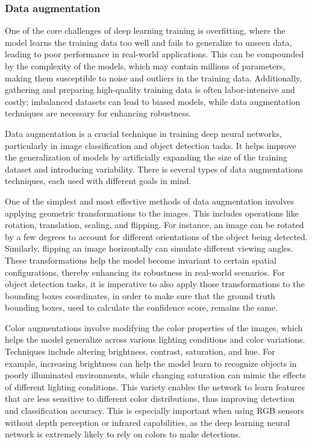 \documentclass[12pt]{article}
\begin{document}
\subsubsection{Data augmentation}

One of the core challenges of deep learning training is overfitting, where the model learns the training data too well and fails to generalize to unseen data, leading to poor performance in real-world applications. This can be compounded by the complexity of the models, which may contain millions of parameters, making them susceptible to noise and outliers in the training data.
Additionally, gathering and preparing high-quality training data is often labor-intensive and costly; imbalanced datasets can lead to biased models, while data augmentation techniques are necessary for enhancing robustness. 

Data augmentation is a crucial technique in training deep neural networks, particularly in image classification and object detection tasks. It helps improve the generalization of models by artificially expanding the size of the training dataset and introducing variability. There is several types of data augmentations techniques, each used with different goals in mind.

One of the simplest and most effective methods of data augmentation involves applying geometric transformations to the images. This includes operations like rotation, translation, scaling, and flipping. For instance, an image can be rotated by a few degrees to account for different orientations of the object being detected. Similarly, flipping an image horizontally can simulate different viewing angles. These transformations help the model become invariant to certain spatial configurations, thereby enhancing its robustness in real-world scenarios. For object detection tasks, it is imperative to also apply those transformations to the bounding boxes coordinates, in order to make sure that the ground truth bounding boxes, used to calculate the confidence score, remains the same.

Color augmentations involve modifying the color properties of the images, which helps the model generalize across various lighting conditions and color variations. Techniques include altering brightness, contrast, saturation, and hue. For example, increasing brightness can help the model learn to recognize objects in poorly illuminated environments, while changing saturation can mimic the effects of different lighting conditions. This variety enables the network to learn features that are less sensitive to different color distributions, thus improving detection and classification accuracy. This is especially important when using RGB sensors without depth perception or infrared capabilities, as the deep learning neural network is extremely likely to rely on colors to make detections.
\end{document}
